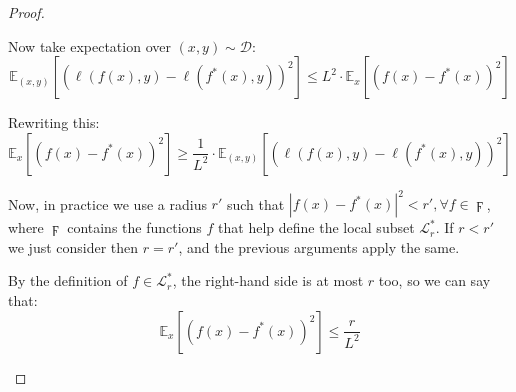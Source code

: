 \documentclass{article}
\newtheorem{proof}{Proof}
\begin{document}
\begin{proof}
\begin{enumerate}
    Now take expectation over \( (x, y) \sim \mathcal{D} \):
    \[
    \mathbb{E}_{(x, y)} \left[ \left( \ell(f(x), y) - \ell(f^*(x), y) \right)^2 \right] \leq L^2 \cdot \mathbb{E}_x \left[ \left( f(x) - f^*(x) \right)^2 \right]
    \]
    
    Rewriting this:
    \[
    \mathbb{E}_x \left[ \left( f(x) - f^*(x) \right)^2 \right] \geq \frac{1}{L^2} \cdot \mathbb{E}_{(x, y)} \left[ \left( \ell(f(x), y) - \ell(f^*(x), y) \right)^2 \right]
    \]

    Now, in practice we use a radius $r'$ such that $|f(x)-f^*(x)|^2 < r', \forall f \in \digamma$, where $\digamma$ contains the functions $f$ that help define the local subset $\mathcal{L}_r^*$. If $r < r'$ we just consider then $r = r'$, and the previous arguments apply the same.
    
    By the definition of \( f \in \mathcal{L}_r^* \), the right-hand side is at most \( r \) too, so we can say that:
    \[
    \mathbb{E}_x \left[ \left( f(x) - f^*(x) \right)^2 \right] \leq \frac{r}{L^2}
    \]


\end{enumerate}
\end{proof}
\end{document}
